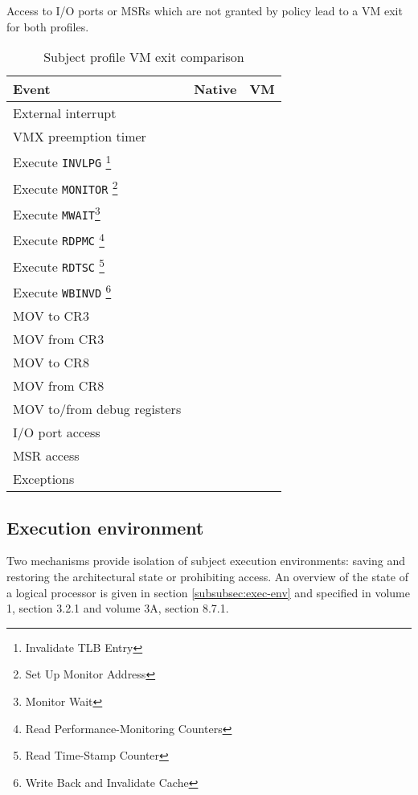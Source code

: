 Access to I/O ports or MSRs which are not granted by policy lead to a
VM exit for both profiles.

\begin{table}[h]
	\centering
	\begin{minipage}[c]{8cm}
	\begin{tabular}{l|c|c}
		\textbf{Event} & \textbf{Native} & \textbf{VM} \\
		\hline
		External interrupt   & \checkmark & \checkmark  \\
		VMX preemption timer & \checkmark & \checkmark  \\
		Execute \texttt{INVLPG}
		\footnote{Invalidate TLB Entry}
		& \checkmark & \checkmark \\
		Execute \texttt{MONITOR}
		\footnote{Set Up Monitor Address}
		& \checkmark & \checkmark \\
		Execute \texttt{MWAIT}\footnote{Monitor Wait}
		& \checkmark & \checkmark \\
		Execute \texttt{RDPMC}
		\footnote{Read Performance-Monitoring Counters}
		& \checkmark & \checkmark \\
		Execute \texttt{RDTSC}
		\footnote{Read Time-Stamp Counter}
		& \checkmark & \checkmark \\
		Execute \texttt{WBINVD}
		\footnote{Write Back and Invalidate Cache}
		& \checkmark & \checkmark \\
		MOV to CR3                  & \checkmark & \\
		MOV from CR3                & \checkmark & \\
		MOV to CR8                  & \checkmark & \checkmark \\
		MOV from CR8                & \checkmark & \checkmark \\
		MOV to/from debug registers & \checkmark & \checkmark \\
		\hline
		I/O port access & \checkmark & \checkmark \\
		MSR access      & \checkmark & \checkmark \\
		Exceptions      & \checkmark & \\
		\hline
	\end{tabular}
	\caption{Subject profile VM exit comparison}
	\label{tab:profiles-cond-vm-exits}
	\end{minipage}
\end{table}

\subsection{Execution environment}
Two mechanisms provide isolation of subject execution environments: saving and
restoring the architectural state or prohibiting access. An overview of the
state of a logical processor is given in section \ref{subsubsec:exec-env} and
specified in \cite{IntelSDM} volume 1, section 3.2.1 and volume 3A,
section 8.7.1.

